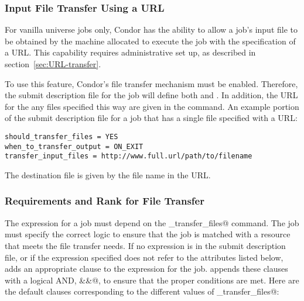 \subsubsection{Input File Transfer Using a URL}
For vanilla universe jobs only,
Condor has the ability to allow a job's input file to be 
obtained by the machine allocated to execute the job
with the specification of a URL.
This capability requires administrative set up, 
as described in section~\ref{sec:URL-transfer}.

To use this feature, Condor's file transfer mechanism must be enabled.
Therefore, the submit description file for the job will define both
 and .
In addition, the URL for the any files specified this way are
given in the  command.
An example portion of the submit description file for a job
that has a single file specified with a URL:

\footnotesize
\begin{verbatim}
should_transfer_files = YES
when_to_transfer_output = ON_EXIT
transfer_input_files = http://www.full.url/path/to/filename
\end{verbatim}
\normalsize

The destination file is given by the file name in the URL. 

\subsubsection{Requirements and Rank for File Transfer}

The  expression for a job must depend
on the \verb@should_transfer_files@ command.
The job must specify the correct logic to ensure that the job is matched
with a resource that meets the file transfer needs.
If no  expression is in the submit description file,
or if the expression specified does not refer to the
attributes listed below,  adds an
appropriate clause to the  expression for the job.
 appends these clauses with a logical AND, \verb@&&@,
to ensure that the proper conditions are met.
Here are the default clauses corresponding to the different values of
\verb@should_transfer_files@:

